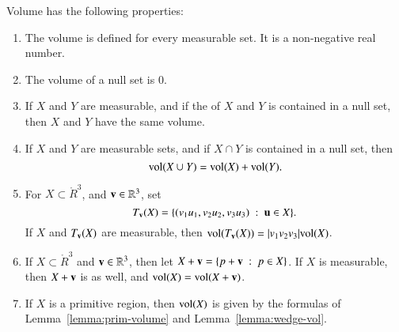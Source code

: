 \begin{lemma}[volume]\label{lemma:volume} 
Volume  has the following properties:
%
\begin{enumerate}%
\item {} The volume is defined for every measurable set.  It is
a non-negative real number.
\item {} The volume of a null set is $0$.
\item {} If $X$ and $Y$ are  measurable, and if
the  of
$X$ and $Y$ is contained in a null set, then 
$X$ and $Y$ have the same volume.  
\item {} If $X$ and $Y$ are measurable sets, and if $X\cap
Y$ is contained in a null set, then
\[ 
{\operatorname{vol}}(X\cup Y) = {\operatorname{vol}}(X) + {\operatorname{vol}}(Y).
\] 
%
%
\item {} For $X\subset \ring{R}^3$, and
${\mathbf v}\in\mathbb{R}^3$, set
\[ 
T_{\mathbf v}(X) = \{ (v_1u_1,v_2u_2,v_3u_3) \ :\  {\mathbf u}\in X\}.
\] 
%
If $X$ and $T_{\mathbf v}(X)$ are measurable, then
${\operatorname{vol}}(T_{\mathbf v}(X)) = |v_1v_2v_3|{\operatorname{vol}}(X)$.
\item {} If $X\subset \ring{R}^3$ and ${\mathbf v}\in\mathbb{R}^3$,
then let $X+{\mathbf v} = \{p + {\mathbf v}\ :\  p\in X\}$.  If $X$ is measurable,
then $X+{\mathbf v}$ is as well, and ${\operatorname{vol}}(X) = {\operatorname{vol}}(X+{\mathbf v})$.
\item {} If $X$ is a primitive region, then 
 ${\operatorname{vol}}(X)$ is given by the formulas of
Lemma~\ref{lemma:prim-volume} and Lemma~\ref{lemma:wedge-vol}.  
\end{enumerate}
\end{lemma}
%
%
%

